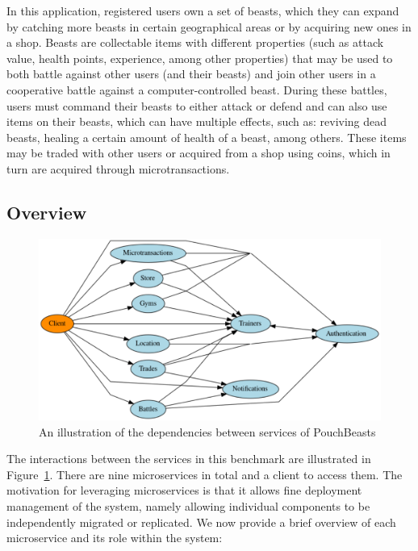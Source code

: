 In this application, registered users own a set of beasts, which they can expand by catching more beasts in certain geographical areas or by acquiring new ones in a shop. Beasts are collectable items with different properties (such as attack value, health points, experience, among other properties) that may be used to both battle against other users (and their beasts) and join other users in a cooperative battle against a computer-controlled beast. During these battles, users must command their beasts to either attack or defend and can also use items on their beasts, which can have multiple effects, such as: reviving dead beasts, healing a certain amount of health of a beast, among others. These items may be traded with other users or acquired from a shop using coins, which in turn are acquired through microtransactions.

\subsection{Overview}

\begin{figure}[htbp]
    \centering
    \includegraphics[width=\textwidth]{Chapters/benchmark/figures/interaction-diagram.pdf}
    \caption{An illustration of the dependencies between services of PouchBeasts}
    \label{fig:pouchbeasts-overview}
\end{figure}

The interactions between the services in this benchmark are illustrated in Figure~\ref{fig:pouchbeasts-overview}. There are nine microservices in total and a client to access them. The motivation for leveraging microservices is that it allows fine deployment management of the system, namely allowing individual components to be independently migrated or replicated. We now provide a brief overview of each microservice and its role within the system:

